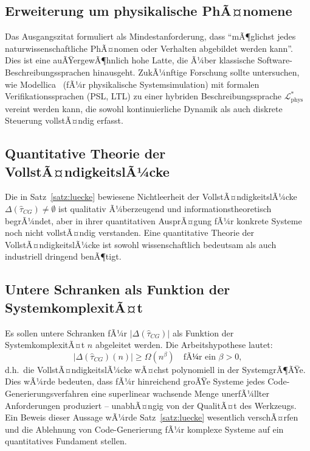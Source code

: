 ﻿\documentclass[a4paper,12pt]{report}
\theoremstyle{definition}
\begin{document}
\subsection{Erweiterung um physikalische PhÃ¤nomene}

Das Ausgangszitat formuliert als Mindestanforderung, dass \enquote{mÃ¶glichst jedes
naturwissenschaftliche PhÃ¤nomen oder Verhalten abgebildet werden kann}. Dies ist eine
auÃŸergewÃ¶hnlich hohe Latte, die Ã¼ber klassische Software-Beschreibungssprachen
hinausgeht. ZukÃ¼nftige Forschung sollte untersuchen, wie Modellica~\cite{modelica2014}
(fÃ¼r physikalische Systemsimulation) mit formalen Verifikationssprachen (PSL, LTL)
zu einer hybriden Beschreibungssprache $\mathcal{L}^*_{\text{phys}}$ vereint werden
kann, die sowohl kontinuierliche Dynamik als auch diskrete Steuerung vollstÃ¤ndig
erfasst.

\subsection{Quantitative Theorie der VollstÃ¤ndigkeitslÃ¼cke}

Die in Satz~\ref{satz:luecke} bewiesene Nichtleerheit der VollstÃ¤ndigkeitslÃ¼cke
$\Delta(\hat{\tau}_{CG}) \neq \emptyset$ ist qualitativ Ã¼berzeugend und informationstheoretisch
begrÃ¼ndet, aber in ihrer quantitativen AusprÃ¤gung fÃ¼r konkrete Systeme noch nicht
vollstÃ¤ndig verstanden. Eine quantitative Theorie der VollstÃ¤ndigkeitslÃ¼cke ist sowohl
wissenschaftlich bedeutsam als auch industriell dringend benÃ¶tigt.

\subsection{Untere Schranken als Funktion der SystemkomplexitÃ¤t}

Es sollen untere Schranken fÃ¼r $|\Delta(\hat{\tau}_{CG})|$ als Funktion der
SystemkomplexitÃ¤t $n$ abgeleitet werden. Die Arbeitshypothese lautet:
\[
  |\Delta(\hat{\tau}_{CG})(n)| \geq \Omega(n^\beta) \quad \text{fÃ¼r ein } \beta > 0,
\]
d.h.\ die VollstÃ¤ndigkeitslÃ¼cke wÃ¤chst polynomiell in der SystemgrÃ¶ÃŸe. Dies wÃ¼rde
bedeuten, dass fÃ¼r hinreichend groÃŸe Systeme jedes Code-Generierungsverfahren
eine superlinear wachsende Menge unerfÃ¼llter Anforderungen produziert -- unabhÃ¤ngig
von der QualitÃ¤t des Werkzeugs. Ein Beweis dieser Aussage wÃ¼rde Satz~\ref{satz:luecke}
wesentlich verschÃ¤rfen und die Ablehnung von Code-Generierung fÃ¼r komplexe Systeme
auf ein quantitatives Fundament stellen.
\end{document}
